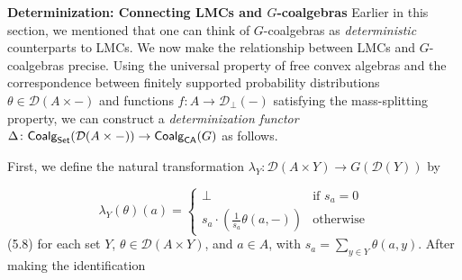 \documentclass[11pt,a4paper]{amsart}
\begin{document}
\par\medskip
\hypertarget{html:S5.SS0.SSS0.Px2}{} \par\noindent\textbf{Determinization: Connecting LMCs and %
\hypertarget{html:S5.SS0.SSS0.Px2.m1}{}\({G}\)-coalgebras}\quad  %
\hypertarget{html:S5.SS0.SSS0.Px2.p1}{} Earlier in this section, we mentioned that one can think of %
\hypertarget{html:S5.SS0.SSS0.Px2.p1.m1}{}\({G}\)-coalgebras as \emph{deterministic} counterparts to LMCs. We now make the relationship between LMCs and %
\hypertarget{html:S5.SS0.SSS0.Px2.p1.m2}{}\({G}\)-coalgebras precise. Using the universal property of free convex algebras and the correspondence between finitely supported probability distributions %
\hypertarget{html:S5.SS0.SSS0.Px2.p1.m3}{}\({\theta\in{\mathcal{D}}(A\times-)}\) and functions %
\hypertarget{html:S5.SS0.SSS0.Px2.p1.m4}{}\({f\colon A\to{\mathcal{D}}_{\bot}(-)}\) satisfying the mass-splitting property, we can construct a \emph{determinization functor} %
\hypertarget{html:S5.SS0.SSS0.Px2.p1.m5}{}\({\Delta\colon\mbox{\sf Coalg}_{\mathsf{Set}}({\mathcal{D}}(A\times-))\to\mbox{\sf Coalg}_{\mathsf{CA}}(G)}\) as follows.
\par\medskip
\hypertarget{html:S5.SS0.SSS0.Px2.p2}{} First, we define the natural transformation %
\hypertarget{html:S5.SS0.SSS0.Px2.p2.m1}{}\({\lambda_{Y}:{\mathcal{D}}(A\times Y)\to G({\mathcal{D}}(Y))}\) by
\par\medskip
\hypertarget{html:S5.E8}{}   %
\hypertarget{html:S5.E8.m1}{}\[\lambda_{Y}(\theta)(a)=\begin{cases}\bot&\mbox{if $s_{a}=0$}\\
s_{a}\cdot(\frac{1}{s_{a}}\theta(a,-))&\mbox{otherwise}\end{cases}\]  (5.8)   for each set %
\hypertarget{html:S5.SS0.SSS0.Px2.p2.m2}{}\({Y}\), %
\hypertarget{html:S5.SS0.SSS0.Px2.p2.m3}{}\({\theta\in{\mathcal{D}}(A\times Y)}\), and %
\hypertarget{html:S5.SS0.SSS0.Px2.p2.m4}{}\({a\in A}\), with %
\hypertarget{html:S5.SS0.SSS0.Px2.p2.m5}{}\({s_{a}=\sum_{y\in Y}\theta(a,y)}\). After making the identification %
\end{document}
